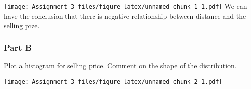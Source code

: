 \documentclass[]{article}
\newenvironment{Shaded}{\begin{snugshade}}{\end{snugshade}}
\newcommand{\KeywordTok}[1]{\textcolor[rgb]{0.13,0.29,0.53}{\textbf{#1}}}
\newcommand{\DataTypeTok}[1]{\textcolor[rgb]{0.13,0.29,0.53}{#1}}
\newcommand{\DecValTok}[1]{\textcolor[rgb]{0.00,0.00,0.81}{#1}}
\newcommand{\StringTok}[1]{\textcolor[rgb]{0.31,0.60,0.02}{#1}}
\newcommand{\OtherTok}[1]{\textcolor[rgb]{0.56,0.35,0.01}{#1}}
\newcommand{\ControlFlowTok}[1]{\textcolor[rgb]{0.13,0.29,0.53}{\textbf{#1}}}
\newcommand{\OperatorTok}[1]{\textcolor[rgb]{0.81,0.36,0.00}{\textbf{#1}}}
\newcommand{\NormalTok}[1]{#1}
\begin{document}
\begin{Shaded}
\end{Shaded}

\texttt{[image: Assignment\_3\_files/figure-latex/unnamed-chunk-1-1.pdf]}
We can have the conclusion that there is negative relationship between
distance and the selling prze.

\subsubsection{Part B}\label{part-b}

Plot a histogram for selling price. Comment on the shape of the
distribution.

\begin{Shaded}
\end{Shaded}

\texttt{[image: Assignment\_3\_files/figure-latex/unnamed-chunk-2-1.pdf]}

\begin{Shaded}
\end{Shaded}
\end{document}
